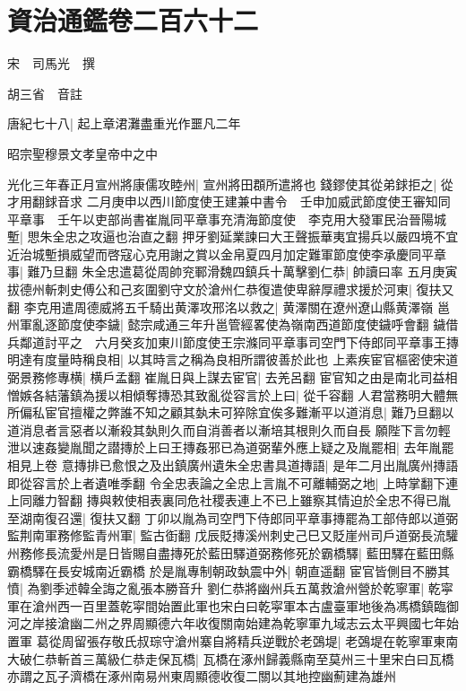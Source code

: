 \section{資治通鑑卷二百六十二}
宋　司馬光　撰

胡三省　音註

唐紀七十八|{
	起上章涒灘盡重光作噩凡二年}


昭宗聖穆景文孝皇帝中之中

光化三年春正月宣州將康儒攻睦州|{
	宣州將田頵所遣將也}
錢鏐使其從弟銶拒之|{
	從才用翻銶音求}
二月庚申以西川節度使王建兼中書令　壬申加威武節度使王審知同平章事　壬午以吏部尚書崔胤同平章事充清海節度使　李克用大發軍民治晉陽城塹|{
	愳朱全忠之攻逼也治直之翻}
押牙劉延業諫曰大王聲振華夷宜揚兵以嚴四境不宜近治城塹損威望而啓寇心克用謝之賞以金帛夏四月加定難軍節度使李承慶同平章事|{
	難乃旦翻}
朱全忠遣葛從周帥兖鄆滑魏四鎮兵十萬擊劉仁恭|{
	帥讀曰率}
五月庚寅拔德州斬刺史傅公和己亥圍劉守文於滄州仁恭復遣使卑辭厚禮求援於河東|{
	復扶又翻}
李克用遣周德威將五千騎出黄澤攻邢洺以救之|{
	黄澤關在遼州遼山縣黄澤嶺}
邕州軍亂逐節度使李鐬|{
	懿宗咸通三年升邕管經畧使為嶺南西道節度使鐬呼會翻}
鐬借兵鄰道討平之　六月癸亥加東川節度使王宗滌同平章事司空門下侍郎同平章事王摶明達有度量時稱良相|{
	以其時言之稱為良相所謂彼善於此也}
上素疾宦官樞密使宋道弼景務修專横|{
	横戶孟翻}
崔胤日與上謀去宦官|{
	去羌呂翻}
宦官知之由是南北司益相憎嫉各結藩鎮為援以相傾奪摶恐其致亂從容言於上曰|{
	從千容翻}
人君當務明大體無所偏私宦官擅權之弊誰不知之顧其埶未可猝除宜俟多難漸平以道消息|{
	難乃旦翻以道消息者言惡者以漸殺其埶則久而自消善者以漸培其根則久而自長}
願陛下言勿輕泄以速姦變胤聞之譛摶於上曰王摶姦邪已為道弼輩外應上疑之及胤罷相|{
	去年胤罷相見上卷}
意摶排已愈恨之及出鎮廣州遺朱全忠書具道摶語|{
	是年二月出胤廣州摶語即從容言於上者遺唯季翻}
令全忠表論之全忠上言胤不可離輔弼之地|{
	上時掌翻下連上同離力智翻}
摶與敕使相表裏同危社稷表連上不已上雖察其情迫於全忠不得已胤至湖南復召還|{
	復扶又翻}
丁卯以胤為司空門下侍郎同平章事摶罷為工部侍郎以道弼監荆南軍務修監青州軍|{
	監古衘翻}
戊辰貶摶溪州刺史己巳又貶崖州司戶道弼長流驩州務修長流愛州是日皆賜自盡摶死於藍田驛道弼務修死於霸橋驛|{
	藍田驛在藍田縣霸橋驛在長安城南近霸橋}
於是胤專制朝政埶震中外|{
	朝直遥翻}
宦官皆側目不勝其憤|{
	為劉季述韓全誨之亂張本勝音升}
劉仁恭將幽州兵五萬救滄州營於乾寧軍|{
	乾寜軍在滄州西一百里蓋乾寜間始置此軍也宋白曰乾寜軍本古盧臺軍地後為馮橋鎮臨御河之岸接滄幽二州之界周顯德六年收復關南始建為乾寧軍九域志云太平興國七年始置軍}
葛從周留張存敬氏叔琮守滄州寨自將精兵逆戰於老鵶堤|{
	老鵶堤在乾寧軍東南}
大破仁恭斬首三萬級仁恭走保瓦橋|{
	瓦橋在涿州歸義縣南至莫州三十里宋白曰瓦橋亦謂之瓦子濟橋在涿州南易州東周顯德收復二關以其地控幽薊建為雄州}
